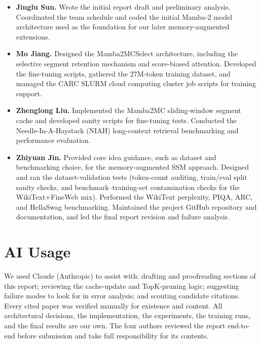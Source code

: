 \documentclass[conference]{IEEEtran}
\begin{document}
\begin{itemize}
    \item \textbf{Jinglu Sun.} Wrote the initial report draft and preliminary analysis. Coordinated the team schedule and coded the initial Mamba-2 model architecture used as the foundation for our later memory-augmented extensions.
    \item \textbf{Mo Jiang.} Designed the Mamba2MCSelect architecture, including the selective segment retention mechanism and score-biased attention. Developed the fine-tuning scripts, gathered the 27M-token training dataset, and managed the CARC SLURM cloud computing cluster job scripts for training support.
    \item \textbf{Zhenglong Liu.} Implemented the Mamba2MC sliding-window segment cache and developed sanity scripts for fine-tuning tests. Conducted the Needle-In-A-Haystack (NIAH) long-context retrieval benchmarking and performance evaluation.
    \item \textbf{Zhiyuan Jin.} Provided core idea guidance, such as dataset and benchmarking choice, for the memory-augmented SSM approach. Designed and ran the dataset-validation tests (token-count auditing, train/eval split sanity checks, and benchmark--training-set contamination checks for the WikiText+FineWeb mix). Performed the WikiText perplexity, PIQA, ARC, and HellaSwag benchmarking. Maintained the project GitHub repository and documentation, and led the final report revision and failure analysis.
\end{itemize}

\section{AI Usage}

We used Claude (Anthropic) to assist with: drafting and proofreading sections of this report; reviewing the cache-update and TopK-pruning logic; suggesting failure modes to look for in error analysis; and scouting candidate citations. Every cited paper was verified manually for existence and content. All architectural decisions, the implementation, the experiments, the training runs, and the final results are our own. The four authors reviewed the report end-to-end before submission and take full responsibility for its contents.



\end{document}
